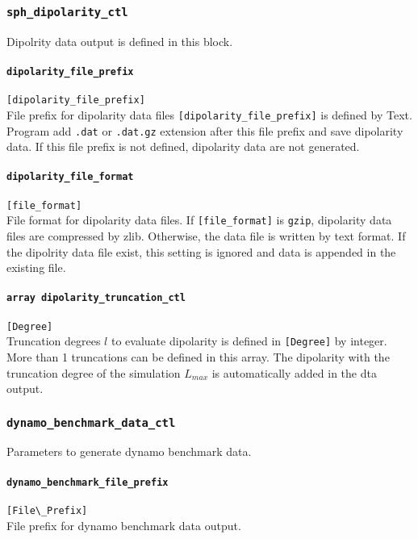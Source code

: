 %
\subsubsection{\tt sph\_dipolarity\_ctl}
\label{href_t:sph_dipolarity_ctl}
Dipolrity data output is defined in this block.

\paragraph{\tt dipolarity\_file\_prefix}
\label{href_t:dipolarity_file_prefix}
\verb|[dipolarity_file_prefix]| \\
File prefix for dipolarity data files \verb|[dipolarity_file_prefix]| is defined by Text. Program add {\tt .dat} or {\tt .dat.gz} extension after this file prefix and save dipolarity data. If this file prefix is not defined, dipolarity data are not generated.

\paragraph{\tt dipolarity\_file\_format}
\label{href_t:dipolarity_file_format}
\verb|[file_format]| \\
File format for dipolarity data files. If \verb|[file_format]| is \verb|gzip|, dipolarity data files are compressed by zlib. Otherwise, the data file is written by text format. If the dipolrity data file exist, this setting is ignored and data is appended in the existing file.

\paragraph{\tt array dipolarity\_truncation\_ctl}
\label{href_t:dipolarity_truncation_ctl}
\verb|[Degree]| \\
Truncation degrees $l$ to evaluate dipolarity is defined in \verb|[Degree]| by integer. More than 1 truncations can be defined in this array. The dipolarity with the truncation degree of the simulation $L_{max}$ is automatically added in the dta output.
%

\subsubsection{\tt dynamo\_benchmark\_data\_ctl}
\label{href_t:dynamo_benchmark_data_ctl}
Parameters to generate dynamo benchmark data.

\paragraph{\tt dynamo\_benchmark\_file\_prefix}
\label{href_t:dynamo_benchmark_file_prefix}
\verb|[File\_Prefix]| \\
File prefix for dynamo benchmark data output.

